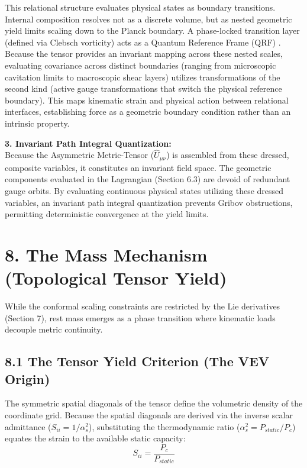 This relational structure evaluates physical states as boundary transitions. Internal composition resolves not as a discrete volume, but as nested geometric yield limits scaling down to the Planck boundary. A phase-locked transition layer (defined via Clebsch vorticity) acts as a Quantum Reference Frame (QRF) \cite{Giacomini2019, Rovelli1996}.  Because the tensor provides an invariant mapping across these nested scales, evaluating covariance across distinct boundaries (ranging from microscopic cavitation limits to macroscopic shear layers) utilizes transformations of the second kind (active gauge transformations that switch the physical reference boundary). This maps kinematic strain and physical action between relational interfaces, establishing force as a geometric boundary condition rather than an intrinsic property.


\textbf{3. Invariant Path Integral Quantization:} \\
Because the Asymmetric Metric-Tensor ($\hat{U}_{\mu\nu}$) is assembled from these dressed, composite variables, it constitutes an invariant field space. 
The geometric components evaluated in the Lagrangian (Section 6.3) are devoid of redundant gauge orbits. By evaluating continuous physical states utilizing these dressed variables, an invariant path integral quantization prevents Gribov obstructions, permitting deterministic convergence at the yield limits. 


\section*{8. The Mass Mechanism (Topological Tensor Yield)}
\label{sec:deriv_mass_mechanism}
While the conformal scaling constraints are restricted by the Lie derivatives (Section 7), rest mass emerges as a phase transition where kinematic loads decouple metric continuity.


\subsection*{8.1 The Tensor Yield Criterion (The VEV Origin)}
The symmetric spatial diagonals of the tensor define the volumetric density of the coordinate grid. Because the spatial diagonals are derived via the inverse scalar admittance ($S_{ii} = 1/\alpha_s^2$), substituting the thermodynamic ratio ($\alpha_s^2 = P_{static}/P_c$) equates the strain to the available static capacity: 
\begin{equation}
    S_{ii} = \frac{P_c}{P_{static}}
\end{equation}

